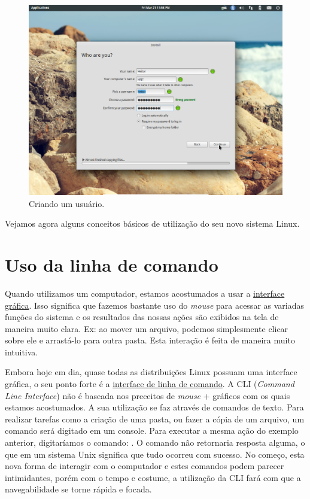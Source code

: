 \documentclass{handout_utfpr}
\newcommand{\com}[1]{
\colorbox{light-gray}{\texttt{\pbox{\textwidth}{\$ #1}}}
}
\begin{document}
\begin{figure}[h]
  \centering
  \includegraphics[scale=.5]{imagens/elementary-install-10.png}
  \caption{Criando um usuário.}
  \label{fig:elementary-info}
\end{figure}


Vejamos agora alguns conceitos básicos de utilização do seu novo sistema Linux.

\section{Uso da linha de comando}

Quando utilizamos um computador, estamos acostumados a usar a \underline{interface gráfica}. Isso significa que fazemos bastante uso do \textit{mouse} para acessar as variadas funções do sistema e os resultados das nossas ações são exibidos na tela de maneira muito clara. Ex: ao mover um arquivo, podemos simplesmente clicar sobre ele e arrastá-lo para outra pasta. Esta interação é feita de maneira muito intuitiva.

Embora hoje em dia, quase todas as distribuições Linux possuam uma interface gráfica, o seu ponto forte é a \underline{interface de linha de comando}. A CLI (\textit{Command Line Interface}) não é baseada nos preceitos de \textit{mouse} + gráficos com os quais estamos acostumados. A sua utilização se faz através de comandos de texto. Para realizar tarefas como a criação de uma pasta, ou fazer a cópia de um arquivo, um comando será digitado em um console. Para executar a mesma ação do exemplo anterior, digitaríamos o comando: \com{mv local\_arquivo local\_destino}. O comando não retornaria resposta alguma, o que em um sistema Unix significa que tudo ocorreu com sucesso. No começo, esta nova forma de interagir com o computador e estes comandos podem parecer intimidantes, porém com o tempo e costume, a utilização da CLI fará com que a navegabilidade se torne rápida e focada.
\end{document}
